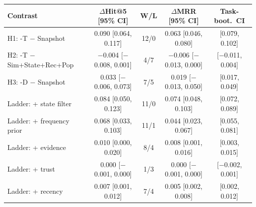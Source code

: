 \begin{tabular}{lcccc}
\toprule
Contrast & $\Delta$Hit@5 [95\% CI] & W/L & $\Delta$MRR [95\% CI] & Task-boot.\ CI \\
\midrule
H1: \sys{}-T $-$ Snapshot & 0.090 [0.064, 0.117] & 12/0 & 0.063 [0.046, 0.080] & [0.079, 0.102] \\
H2: \sys{}-T $-$ Sim+State+Rec+Pop & $-$0.004 [$-$0.008, 0.001] & 4/7 & $-$0.006 [$-$0.013, 0.000] & [$-$0.011, 0.004] \\
H3: \sys{}-D $-$ Snapshot & 0.033 [$-$0.006, 0.073] & 7/5 & 0.019 [$-$0.013, 0.050] & [0.017, 0.049] \\
\midrule
Ladder: + state filter & 0.084 [0.050, 0.123] & 11/0 & 0.074 [0.048, 0.103] & [0.072, 0.089] \\
Ladder: + frequency prior & 0.068 [0.033, 0.103] & 11/1 & 0.044 [0.023, 0.067] & [0.055, 0.081] \\
Ladder: + evidence & 0.010 [0.000, 0.020] & 8/4 & 0.008 [0.001, 0.016] & [0.003, 0.015] \\
Ladder: + trust & 0.000 [$-$0.001, 0.000] & 1/3 & 0.000 [$-$0.001, 0.000] & [$-$0.002, 0.001] \\
Ladder: + recency & 0.007 [0.001, 0.012] & 7/4 & 0.005 [0.002, 0.008] & [0.002, 0.012] \\
\bottomrule
\end{tabular}
